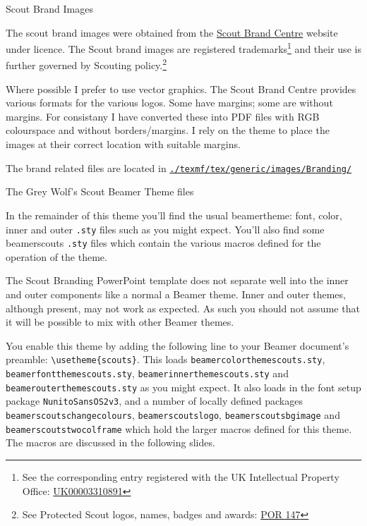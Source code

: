 \begin{frame}{Scout Brand Images}
\hypertarget{brand}{}
\scriptsize
\parbox{\textwidth}{The scout brand images were obtained from the \href{https://scoutsbrand.org.uk/}{Scout Brand Centre} website under licence. The Scout brand images are registered trademarks\footnote{See the corresponding entry registered with the UK Intellectual Property Office: \href{https://trademarks.ipo.gov.uk/ipo-tmcase/page/Results/1/UK00003310891}{UK00003310891}} and their use is further governed by Scouting policy.\footnote{See Protected Scout logos, names, badges and awards: \href{https://www.scouts.org.uk/por/14-other-matters/rule-147-protected-scout-logos-names-badges-and-awards/}{POR 147}}}

\parbox{\textwidth}{Where possible I prefer to use vector graphics. The Scout Brand Centre provides various formats for the various logos. Some have margins; some are without margins. For consistany I have converted these into PDF files with RGB colourspace and without borders/margins. I rely on the theme to place the images at their correct location with suitable margins.}

\parbox{\textwidth}{The brand related files are located in \href{file:texmf/tex/generic/images/Branding/}{\tt ./texmf/tex/generic/images/Branding/}}
\end{frame}

\begin{frame}{The Grey Wolf's Scout Beamer Theme files}
\scriptsize
\parbox{\textwidth}{In the remainder of this theme you'll find the usual \alert{beamertheme}: font, color, inner and outer {\tt .sty} files such as you might expect. You'll also find some \alert{beamerscouts} {\tt .sty} files which contain the various macros defined for the operation of the theme.}

\parbox{\textwidth}{The Scout Branding PowerPoint template does not separate well into the inner and outer components like a normal a Beamer theme. Inner and outer themes, although present, may not work as expected. As such you should not assume that it will be possible to mix with other Beamer themes.}

\parbox{\textwidth}{You enable this theme by adding the following line to your Beamer document's preamble: \alert{{\tt \textbackslash{}usetheme\{scouts\}}}. This loads {\tt beamercolorthemescouts.sty}, {\tt beamerfontthemescouts.sty}, {\tt beamerinnerthemescouts.sty} and {\tt beamerouterthemescouts.sty} as you might expect.  It also loads in the font setup package {\tt NunitoSansOS2v3}, and a number of locally defined packages {\tt beamerscoutschangecolours}, {\tt beamerscoutslogo}, {\tt beamerscoutsbgimage} and {\tt beamerscoutstwocolframe} which hold the larger macros defined for this theme. The macros are discussed in the following slides.}
\end{frame}

